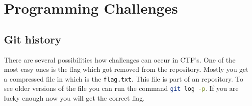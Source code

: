 
\section{Programming Challenges}

\subsection{Git history} There are several possibilities how challenges can occur in CTF's. One of the most easy ones is the flag which got removed from the repository. Mostly you get a compressed file in which is the \texttt{flag.txt}. This file is part of an repository. To see older versions of the file you can run the command \lstinline[language=bash]|git log -p|. If you are lucky enough now you will get the correct flag.